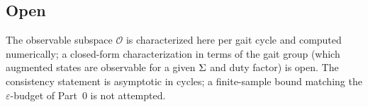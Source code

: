 \subsection{Open}
\label{sec:n2-open}
The observable subspace $\mathcal{O}$ is characterized here per gait cycle and
computed numerically; a closed-form characterization in terms of the gait group
(which augmented states are observable for a given $\Sigma$ and duty factor)
is open. The consistency statement is asymptotic in cycles; a finite-sample
bound matching the $\varepsilon$-budget of Part~0 is not attempted.
